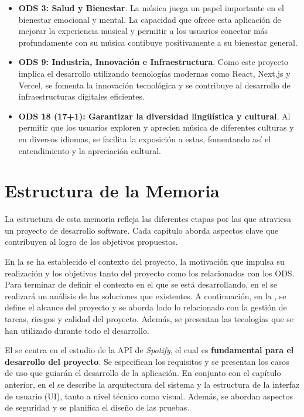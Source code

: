 \begin{itemize}
    \item \textbf{ODS 3: Salud y Bienestar}. La música juega un papel importante en el bienestar emocional y mental. La capacidad que ofrece esta aplicación de mejorar la experiencia musical y permitir a los usuarios conectar más profundamente con su música contibuye positivamente a su bienestar general.
    \item \textbf{ODS 9: Industria, Innovación e Infraestructura}. Como este proyecto implica el desarrollo utilizando tecnologías modernas como React, Next.js y Vercel, se fomenta la innovación tecnológica y se contribuye al desarrollo de infraestructuras digitales eficientes.
    \item \textbf{ODS 18 (17+1): Garantizar la diversidad lingüística y cultural}. Al permitir que los usuarios exploren y aprecien música de diferentes culturas y en diversos idiomas, se facilita la exposición a estas, fomentando así el entendimiento y la apreciación cultural.
\end{itemize}

\section{Estructura de la Memoria}

La estructura de esta memoria refleja las diferentes etapas por las que atraviesa un proyecto de desarrollo software. Cada capítulo aborda aspectos clave que contribuyen al logro de los objetivos propuestos.

En la  se ha establecido el contexto del proyecto, la motivación que impulsa su realización y los objetivos tanto del proyecto como los relacionados con los ODS. Para terminar de definir el contexto en el que se está desarrollando, en el  se realizará un análisis de las soluciones que existentes. A continuación, en la , se define el alcance del proyecto y se aborda lodo lo relacionado con la gestión de tareas, riesgos y calidad del proyecto. Además, se presentan las tecologías que se han utilizado durante todo el desarrollo.

El  se centra en el estudio de la API de \textit{Spotify}, el cual es \textbf{fundamental para el desarrollo del proyecto}. Se especifican los requisitos y se presentan los casos de uso que guiarán el desarrollo de la aplicación. En conjunto con el capítulo anterior, en el  se describe la arquitectura del sistema y la estructura de la interfaz de usuario (UI), tanto a nivel técnico como visual. Además, se abordan aspectos de seguridad y se planifica el diseño de las pruebas.

